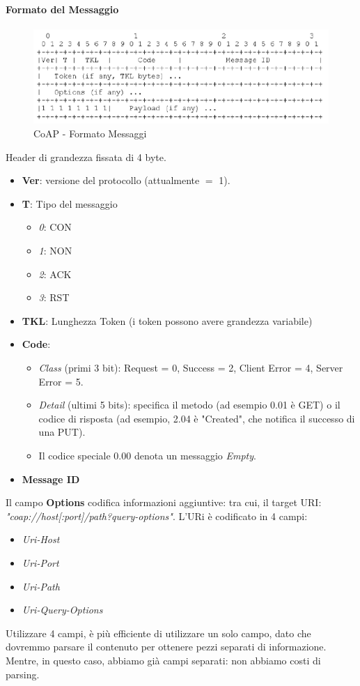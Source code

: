\documentclass{article}
\begin{document}
\paragraph{Formato del Messaggio} 
\begin{figure}[H]
\centering
\includegraphics[scale=0.6]{figures/coap formato messaggi.png}
\caption{CoAP - Formato Messaggi}
\end{figure}
Header di grandezza fissata di 4 byte.
\begin{itemize}
    \item \textbf{Ver}: versione del protocollo (attualmente $=$ 1).
    \item \textbf{T}: Tipo del messaggio
    \begin{itemize}
        \item \textit{0}: CON
        \item \textit{1}: NON
        \item \textit{2}: ACK
        \item \textit{3}: RST
    \end{itemize}
    \item \textbf{TKL}: Lunghezza Token (i token possono avere grandezza variabile)
    \item \textbf{Code}: 
    \begin{itemize}
        \item \textit{Class} (primi 3 bit): Request = 0, Success = 2, Client Error = 4, Server Error = 5.
        \item \textit{Detail} (ultimi 5 bits): specifica il metodo (ad esempio 0.01 è GET) o il codice di risposta (ad esempio, 2.04 è "Created", che notifica il successo di una PUT).
        \item Il codice speciale 0.00 denota un messaggio \textit{Empty}.
    \end{itemize}
    \item \textbf{Message ID}
\end{itemize}
Il campo \textbf{Options} codifica informazioni aggiuntive:
tra cui, il target URI: \textit{"coap://host[:port]/path?query-options"}. L'URi è codificato in 4 campi:
\begin{itemize}
    \item \textit{Uri-Host}
    \item \textit{Uri-Port}
    \item \textit{Uri-Path}
    \item \textit{Uri-Query-Options}
\end{itemize}
Utilizzare 4 campi, è più efficiente di utilizzare un solo campo, dato che dovremmo parsare il contenuto per ottenere pezzi separati di informazione. Mentre, in questo caso, abbiamo già campi separati: non abbiamo costi di parsing. 
\end{document}
